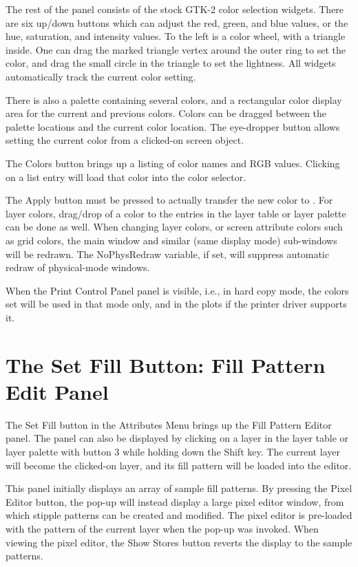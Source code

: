 The rest of the panel consists of the stock GTK-2 color selection
widgets.  There are six up/down buttons which can adjust the red,
green, and blue values, or the hue, saturation, and intensity values. 
To the left is a color wheel, with a triangle inside.  One can drag
the marked triangle vertex around the outer ring to set the color, and
drag the small circle in the triangle to set the lightness.  All
widgets automatically track the current color setting. 

There is also a palette containing several colors, and a rectangular
color display area for the current and previous colors.  Colors can be
dragged between the palette locations and the current color location. 
The eye-dropper button allows setting the current color from a
clicked-on screen object.

The {\cb Colors} button brings up a listing of color names and RGB
values.  Clicking on a list entry will load that color into the color
selector.

The {\cb Apply} button must be pressed to actually transfer the new
color to {\Xic}.  For layer colors, drag/drop of a color to the
entries in the layer table or layer palette can be done as well.  When
changing layer colors, or screen attribute colors such as grid colors,
the main window and similar (same display mode) sub-windows will be
redrawn.  The {\et NoPhysRedraw} variable, if set, will suppress
automatic redraw of physical-mode windows.

When the {\cb Print Control Panel} panel is visible, i.e., in hard
copy mode, the colors set will be used in that mode only, and in the
plots if the printer driver supports it.


\section{The {\cb Set Fill} Button: Fill Pattern Edit Panel}
The {\cb Set Fill} button in the {\cb Attributes Menu} brings up the
{\cb Fill Pattern Editor} panel.  The panel can also be displayed by
clicking on a layer in the layer table or layer palette with button 3
while holding down the {\kb Shift} key.  The current layer will become
the clicked-on layer, and its fill pattern will be loaded into the
editor.

This panel initially displays an array of sample fill patterns.  By
pressing the {\cb Pixel Editor} button, the pop-up will instead
display a large pixel editor window, from which stipple patterns can
be created and modified.  The pixel editor is pre-loaded with the
pattern of the current layer when the pop-up was invoked.  When
viewing the pixel editor, the {\cb Show Stores} button reverts the
display to the sample patterns.

